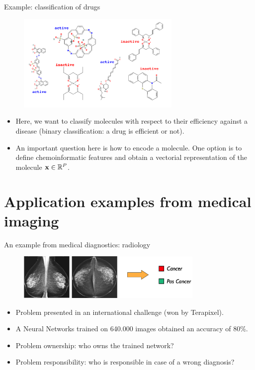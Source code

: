 \documentclass[xcolor=pdftex,dvipsnames,table]{beamer}
\begin{document}
\begin{frame}{Example: classification of drugs}
\begin{figure}[htb]
\includegraphics[width=0.7\textwidth]{../graphics/ml_example_drugs.pdf}
\end{figure}
\begin{itemize}
	\item Here, we want to classify molecules with respect to their efficiency against a disease (binary classification: a drug is efficient or not).
	\item An important question here is how to encode a molecule. One option is to define chemoinformatic features and obtain a vectorial representation of the molecule $\mathbf{x} \in \mathbb{R}^{P}$.
\end{itemize}
\end{frame}


\section{Application examples from medical imaging}
\begin{frame}{An example from  medical diagnostics: radiology}
\begin{figure}[htb]
\includegraphics[width=0.8\textwidth]{../graphics/radiology.pdf}
\end{figure}

\begin{itemize}
\item<1-> Problem presented in an international challenge (won by Terapixel).
\item<2-> A Neural Networks trained on 640.000 images obtained an accuracy of 80\%. \
\item<3-> Problem ownership: who owns the trained network?
\item<4-> Problem responsibility: who is responsible in case of a wrong diagnosis?
\end{itemize}
\end{frame}
\end{document}
